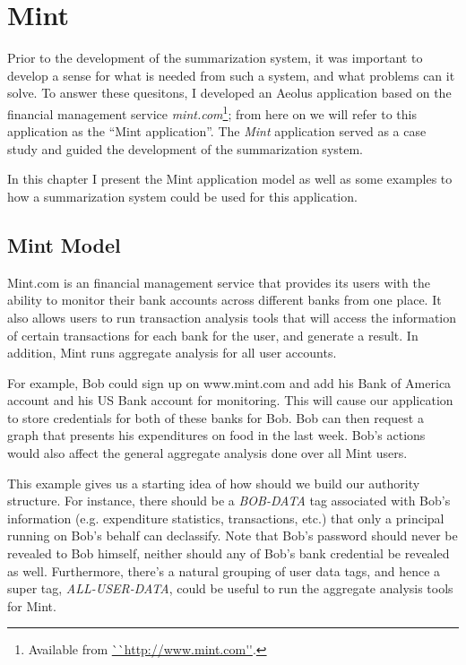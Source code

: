 \chapter{Mint}\label{mint}

Prior to the development of the summarization system, it was important to develop a sense for what is needed from such a system, and what problems can it solve. To answer these quesitons, I developed an Aeolus application based on the financial management service \emph{mint.com}\footnote{Available from \url{``http://www.mint.com''}.}; from here on we will refer to this application as the ``Mint application''. The \emph{Mint} application served as a case study and guided the development of the summarization system.

In this chapter I present the Mint application model as well as some examples to how a summarization system could be used for this application.

\section{Mint Model}

Mint.com is an financial management service that provides its users with the ability to monitor their bank accounts across different banks from one place. It also allows users to run transaction analysis tools that will access the information of certain transactions for each bank for the user, and generate a result. In addition, Mint runs aggregate analysis for all user accounts.

For example, Bob could sign up on www.mint.com and add his Bank of America account and his US Bank account for monitoring. This will cause our application to store credentials for both of these banks for Bob. Bob can then request a graph that presents his expenditures on food in the last week. Bob's actions would also affect the general aggregate analysis done over all Mint users.

This example gives us a starting idea of how should we build our authority structure. For instance, there should be a \emph{BOB-DATA} tag associated with Bob's information (e.g. expenditure statistics, transactions, etc.) that only a principal running on Bob's behalf can declassify. Note that Bob's password should never be revealed to Bob himself, neither should any of Bob's bank credential be revealed as well. Furthermore, there's a natural grouping of user data tags, and hence a super tag, \emph{ALL-USER-DATA}, could be useful to run the aggregate analysis tools for Mint.

